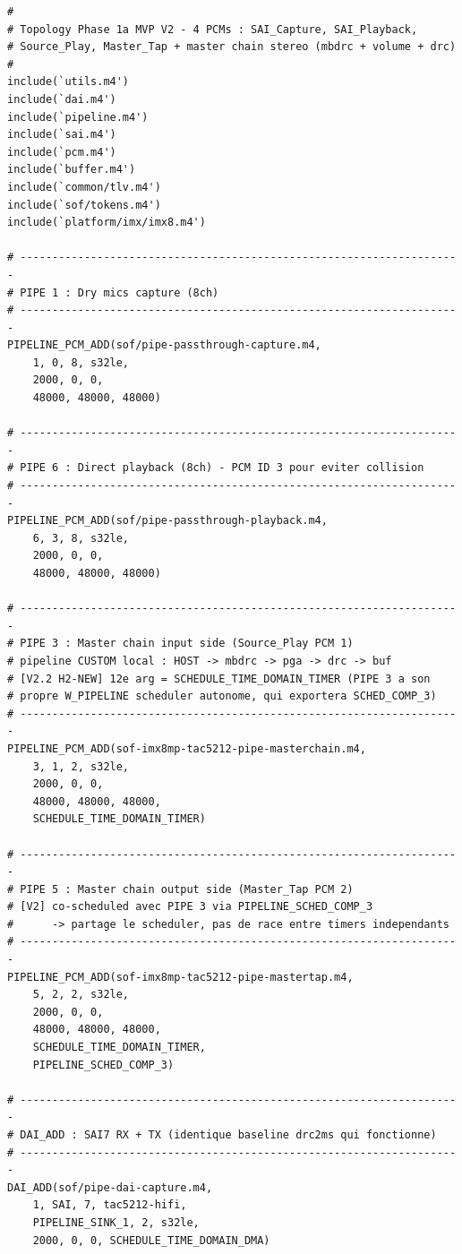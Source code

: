 \documentclass[11pt,a4paper]{article}
\begin{document}
\begin{lstlisting}[language={}, basicstyle=\ttfamily\scriptsize]
#
# Topology Phase 1a MVP V2 - 4 PCMs : SAI_Capture, SAI_Playback,
# Source_Play, Master_Tap + master chain stereo (mbdrc + volume + drc)
#
include(`utils.m4')
include(`dai.m4')
include(`pipeline.m4')
include(`sai.m4')
include(`pcm.m4')
include(`buffer.m4')
include(`common/tlv.m4')
include(`sof/tokens.m4')
include(`platform/imx/imx8.m4')

# ---------------------------------------------------------------------
# PIPE 1 : Dry mics capture (8ch)
# ---------------------------------------------------------------------
PIPELINE_PCM_ADD(sof/pipe-passthrough-capture.m4,
    1, 0, 8, s32le,
    2000, 0, 0,
    48000, 48000, 48000)

# ---------------------------------------------------------------------
# PIPE 6 : Direct playback (8ch) - PCM ID 3 pour eviter collision
# ---------------------------------------------------------------------
PIPELINE_PCM_ADD(sof/pipe-passthrough-playback.m4,
    6, 3, 8, s32le,
    2000, 0, 0,
    48000, 48000, 48000)

# ---------------------------------------------------------------------
# PIPE 3 : Master chain input side (Source_Play PCM 1)
# pipeline CUSTOM local : HOST -> mbdrc -> pga -> drc -> buf
# [V2.2 H2-NEW] 12e arg = SCHEDULE_TIME_DOMAIN_TIMER (PIPE 3 a son
# propre W_PIPELINE scheduler autonome, qui exportera SCHED_COMP_3)
# ---------------------------------------------------------------------
PIPELINE_PCM_ADD(sof-imx8mp-tac5212-pipe-masterchain.m4,
    3, 1, 2, s32le,
    2000, 0, 0,
    48000, 48000, 48000,
    SCHEDULE_TIME_DOMAIN_TIMER)

# ---------------------------------------------------------------------
# PIPE 5 : Master chain output side (Master_Tap PCM 2)
# [V2] co-scheduled avec PIPE 3 via PIPELINE_SCHED_COMP_3
#      -> partage le scheduler, pas de race entre timers independants
# ---------------------------------------------------------------------
PIPELINE_PCM_ADD(sof-imx8mp-tac5212-pipe-mastertap.m4,
    5, 2, 2, s32le,
    2000, 0, 0,
    48000, 48000, 48000,
    SCHEDULE_TIME_DOMAIN_TIMER,
    PIPELINE_SCHED_COMP_3)

# ---------------------------------------------------------------------
# DAI_ADD : SAI7 RX + TX (identique baseline drc2ms qui fonctionne)
# ---------------------------------------------------------------------
DAI_ADD(sof/pipe-dai-capture.m4,
    1, SAI, 7, tac5212-hifi,
    PIPELINE_SINK_1, 2, s32le,
    2000, 0, 0, SCHEDULE_TIME_DOMAIN_DMA)


\end{lstlisting}
\end{document}
